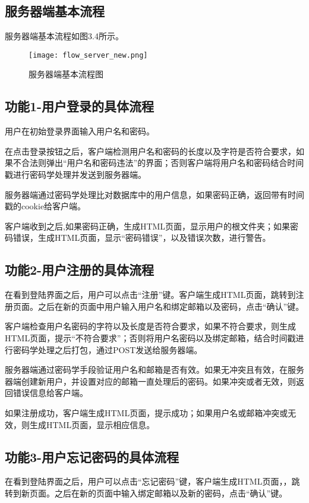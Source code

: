 \subsection{服务器端基本流程}
服务器端基本流程如图3.4所示。
\begin{figure}[h] 
\centering
\texttt{[image: flow\_server\_new.png]}
\caption{服务器端基本流程图}\label{fig:noted-figure}
\end{figure} 



\subsection{功能1-用户登录的具体流程} 

用户在初始登录界面输入用户名和密码。

在点击登录按钮之后，客户端检测用户名和密码的长度以及字符是否符合要求，如果不合法则弹出“用户名和密码违法”的界面；否则客户端将用户名和密码结合时间戳进行密码学处理并发送到服务器端。

服务器端通过密码学处理比对数据库中的用户信息，如果密码正确，返回带有时间戳的cookie给客户端。

客户端收到之后,如果密码正确，生成HTML页面，显示用户的根文件夹；如果密码错误，生成HTML页面，显示“密码错误”，以及错误次数，进行警告。

\subsection{功能2-用户注册的具体流程}

在看到登陆界面之后，用户可以点击“注册”键。客户端生成HTML页面，跳转到注册页面。之后在新的页面中用户输入用户名和绑定邮箱以及密码，点击“确认”键。

客户端检查用户名密码的字符以及长度是否符合要求，如果不符合要求，则生成HTML页面，提示“不符合要求”；否则将用户名密码以及绑定邮箱，结合时间戳进行密码学处理之后打包，通过POST发送给服务器端。

服务器端通过密码学手段验证用户名和邮箱是否有效。如果无冲突且有效，在服务器端创建新用户，并设置对应的邮箱一直处理后的密码。如果冲突或者无效，则返回错误信息给客户端。

如果注册成功，客户端生成HTML页面，提示成功；如果用户名或邮箱冲突或无效，则生成HTML页面，显示相应信息。

\subsection{功能3-用户忘记密码的具体流程}
在看到登陆界面之后，用户可以点击“忘记密码”键，客户端生成HTML页面，，跳转到新页面。之后在新的页面中输入绑定邮箱以及新的密码，点击“确认”键。

